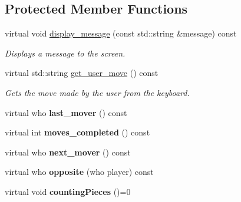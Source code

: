 \subsection*{Protected Member Functions}
\begin{DoxyCompactItemize}
\item 
virtual void \hyperlink{classmain__savitch__14_1_1game_ab8b87c3a1b68634861a8c0ed2b9f1992}{display\+\_\+message} (const std\+::string \&message) const 
\begin{DoxyCompactList}\small\item\em Displays a message to the screen. \end{DoxyCompactList}\item 
virtual std\+::string \hyperlink{classmain__savitch__14_1_1game_a1265f262f5a15bca5b532e6e97d13089}{get\+\_\+user\+\_\+move} () const \hypertarget{classmain__savitch__14_1_1game_a1265f262f5a15bca5b532e6e97d13089}{}\label{classmain__savitch__14_1_1game_a1265f262f5a15bca5b532e6e97d13089}

\begin{DoxyCompactList}\small\item\em Gets the move made by the user from the keyboard. \end{DoxyCompactList}\item 
virtual who {\bfseries last\+\_\+mover} () const \hypertarget{classmain__savitch__14_1_1game_a38d435da6aadc192ac10160b26ea0cc1}{}\label{classmain__savitch__14_1_1game_a38d435da6aadc192ac10160b26ea0cc1}

\item 
virtual int {\bfseries moves\+\_\+completed} () const \hypertarget{classmain__savitch__14_1_1game_aee677d1ef52c35474cb7c6071bb71749}{}\label{classmain__savitch__14_1_1game_aee677d1ef52c35474cb7c6071bb71749}

\item 
virtual who {\bfseries next\+\_\+mover} () const \hypertarget{classmain__savitch__14_1_1game_a0d445fdec3201c91c145ee2763e08922}{}\label{classmain__savitch__14_1_1game_a0d445fdec3201c91c145ee2763e08922}

\item 
virtual who {\bfseries opposite} (who player) const \hypertarget{classmain__savitch__14_1_1game_ae38d001e92ebe46e1a1433e41446c7ab}{}\label{classmain__savitch__14_1_1game_ae38d001e92ebe46e1a1433e41446c7ab}

\item 
virtual void {\bfseries counting\+Pieces} ()=0\hypertarget{classmain__savitch__14_1_1game_a5954eccb6abf1ae900ad853ad2af99fa}{}\label{classmain__savitch__14_1_1game_a5954eccb6abf1ae900ad853ad2af99fa}


\end{DoxyCompactItemize}
